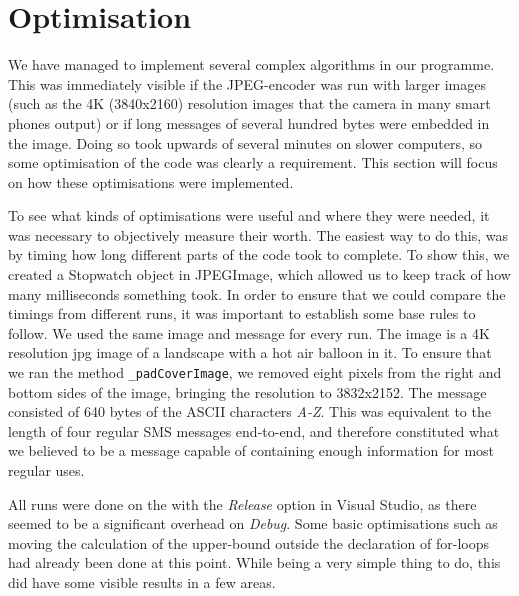 \section{Optimisation}
We have managed to implement several complex algorithms in our programme.
This was immediately visible if the JPEG-encoder was run with larger images (such as the 4K (3840x2160) resolution images that the camera in many smart phones output) or if long messages of several hundred bytes were embedded in the image.
Doing so took upwards of several minutes on slower computers, so some optimisation of the code was clearly a requirement.
This section will focus on how these optimisations were implemented.
\vspace*{12pt}

To see what kinds of optimisations were useful and where they were needed, it was necessary to objectively measure their worth.
The easiest way to do this, was by timing how long different parts of the code took to complete.
To show this, we created a Stopwatch object in JPEGImage, which allowed us to keep track of how many milliseconds something took.
In order to ensure that we could compare the timings from different runs, it was important to establish some base rules to follow.
We used the same image and message for every run.
The image is a 4K resolution jpg image of a landscape with a hot air balloon in it.
To ensure that we ran the method \lstinline|_padCoverImage|, we removed eight pixels from the right and bottom sides of the image, bringing the resolution to 3832x2152.
The message consisted of 640 bytes of the ASCII characters \textit{A-Z}.
This was equivalent to the length of four regular SMS messages end-to-end, and therefore constituted what we believed to be a message capable of containing enough information for most regular uses.

All runs were done on the with the \textit{Release} option in Visual Studio, as there seemed to be a significant overhead on \textit{Debug}.
Some basic optimisations such as moving the calculation of the upper-bound outside the declaration of for-loops had already been done at this point.
While being a very simple thing to do, this did have some visible results in a few areas.


